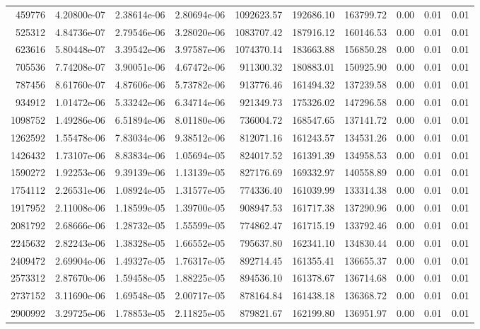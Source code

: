 \begin{table*}[htbp]
\begin{tabular}{r r r r r r r r r r}
459776 & 4.20800e-07 & 2.38614e-06 & 2.80694e-06 & 1092623.57 & 192686.10 & 163799.72 & 0.00 & 0.01 & 0.01 \\
525312 & 4.84736e-07 & 2.79546e-06 & 3.28020e-06 & 1083707.42 & 187916.12 & 160146.53 & 0.00 & 0.01 & 0.01 \\
623616 & 5.80448e-07 & 3.39542e-06 & 3.97587e-06 & 1074370.14 & 183663.88 & 156850.28 & 0.00 & 0.01 & 0.01 \\
705536 & 7.74208e-07 & 3.90051e-06 & 4.67472e-06 & 911300.32 & 180883.01 & 150925.90 & 0.00 & 0.01 & 0.01 \\
787456 & 8.61760e-07 & 4.87606e-06 & 5.73782e-06 & 913776.46 & 161494.32 & 137239.58 & 0.00 & 0.01 & 0.01 \\
934912 & 1.01472e-06 & 5.33242e-06 & 6.34714e-06 & 921349.73 & 175326.02 & 147296.58 & 0.00 & 0.01 & 0.01 \\
1098752 & 1.49286e-06 & 6.51894e-06 & 8.01180e-06 & 736004.72 & 168547.65 & 137141.72 & 0.00 & 0.01 & 0.01 \\
1262592 & 1.55478e-06 & 7.83034e-06 & 9.38512e-06 & 812071.16 & 161243.57 & 134531.26 & 0.00 & 0.01 & 0.01 \\
1426432 & 1.73107e-06 & 8.83834e-06 & 1.05694e-05 & 824017.52 & 161391.39 & 134958.53 & 0.00 & 0.01 & 0.01 \\
1590272 & 1.92253e-06 & 9.39139e-06 & 1.13139e-05 & 827176.69 & 169332.97 & 140558.89 & 0.00 & 0.01 & 0.01 \\
1754112 & 2.26531e-06 & 1.08924e-05 & 1.31577e-05 & 774336.40 & 161039.99 & 133314.38 & 0.00 & 0.01 & 0.01 \\
1917952 & 2.11008e-06 & 1.18599e-05 & 1.39700e-05 & 908947.53 & 161717.38 & 137290.96 & 0.00 & 0.01 & 0.01 \\
2081792 & 2.68666e-06 & 1.28732e-05 & 1.55599e-05 & 774862.47 & 161715.19 & 133792.46 & 0.00 & 0.01 & 0.01 \\
2245632 & 2.82243e-06 & 1.38328e-05 & 1.66552e-05 & 795637.80 & 162341.10 & 134830.44 & 0.00 & 0.01 & 0.01 \\
2409472 & 2.69904e-06 & 1.49327e-05 & 1.76317e-05 & 892714.45 & 161355.41 & 136655.37 & 0.00 & 0.01 & 0.01 \\
2573312 & 2.87670e-06 & 1.59458e-05 & 1.88225e-05 & 894536.10 & 161378.67 & 136714.68 & 0.00 & 0.01 & 0.01 \\
2737152 & 3.11690e-06 & 1.69548e-05 & 2.00717e-05 & 878164.84 & 161438.18 & 136368.72 & 0.00 & 0.01 & 0.01 \\
2900992 & 3.29725e-06 & 1.78853e-05 & 2.11825e-05 & 879821.67 & 162199.80 & 136951.97 & 0.00 & 0.01 & 0.01 \\

\end{tabular}
\end{table*}
